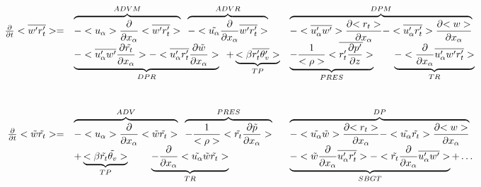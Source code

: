 \begin{displaymath}
\left.
\begin{array}{rllll}
\frac{\partial }{\partial t} <\overline{w'r_t'}> = & 
\overbrace{- <u_\alpha>\frac{\partial}{\partial x_\alpha} <\overline{w'r_t'}> }^{ADVM} \;\;
\overbrace{- <\tilde{u_\alpha}\frac{\partial}{\partial x_\alpha} \overline{w'r_t'} > }^{ADVR} &
\overbrace{- <\overline{u_\alpha'w'}> \frac{\partial {<r_t>}}{\partial x_\alpha}
- <\overline{u'_\alpha r_t'}> \frac{\partial {<w>}}{\partial x_\alpha}}^{DPM} \\
\vspace*{1.0cm}
& \underbrace{- <\overline{u'_\alpha w'} \frac{\partial {\tilde{r_t}}}{\partial x_\alpha}>
- <\overline{u'_\alpha r_t'} \frac{\partial {\tilde{w}}}{\partial x_\alpha}>}_{DPR} \;\;
+ \underbrace{<\beta  \overline{r_t'\theta'_v}>}_{TP} &
\underbrace{- \frac{1}{<\rho>}<\overline{r_t' \frac{\partial p'}{\partial z}}>}_{PRES} \;\;\;\;\;\;\;
 \underbrace{- <\frac{\partial}{\partial x_\alpha} \overline{u'_\alpha w'r_t'}>}_{TR} \\
\frac{\partial }{\partial t} <\tilde{w}\tilde{r_t}> = & 
\overbrace{- <u_\alpha>\frac{\partial}{\partial x_\alpha} <\tilde{w}\tilde{r_t}> }^{ADV} \;\;
\overbrace{- \frac{1}{<\rho>}<\tilde{r_t} \frac{\partial \tilde{p}}{\partial x_\alpha}>}^{PRES} &
\overbrace{- <\tilde{u_\alpha} \tilde{w}> \frac{\partial {<r_t>}}{\partial x_\alpha}
- <\tilde{u_\alpha} \tilde{r_t}> \frac{\partial {<w>}}{\partial x_\alpha}}^{DP} &\\
&+ \underbrace{<\beta  \tilde{r_t}\tilde{\theta_v}>}_{TP} \;\;\;\;\;\;\;\;
 \underbrace{- \frac{\partial}{\partial x_\alpha} <\tilde{u_\alpha} \tilde{w}\tilde{r_t}>}_{TR} &
\underbrace{- <\tilde{w}\frac{\partial}{\partial x_\alpha}\overline{u'_\alpha r_t'}>
- <\tilde{r_t}\frac{\partial}{\partial x_\alpha}\overline{u'_\alpha w'}>}_{SBGT}  + \ldots&
\end{array}
\right.
\end{displaymath}

